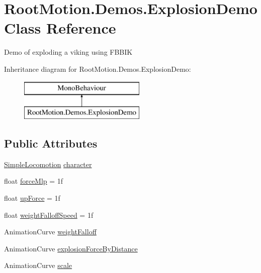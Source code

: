\hypertarget{class_root_motion_1_1_demos_1_1_explosion_demo}{}\section{Root\+Motion.\+Demos.\+Explosion\+Demo Class Reference}
\label{class_root_motion_1_1_demos_1_1_explosion_demo}


Demo of exploding a viking using F\+B\+B\+IK  


Inheritance diagram for Root\+Motion.\+Demos.\+Explosion\+Demo\+:\begin{figure}[H]
\begin{center}
\leavevmode
\includegraphics[height=2.000000cm]{class_root_motion_1_1_demos_1_1_explosion_demo}
\end{center}
\end{figure}
\subsection*{Public Attributes}
\begin{DoxyCompactItemize}
\item 
\mbox{\hyperlink{class_root_motion_1_1_demos_1_1_simple_locomotion}{Simple\+Locomotion}} \mbox{\hyperlink{class_root_motion_1_1_demos_1_1_explosion_demo_a1657eeab96d984275fc68ca602036c65}{character}}
\item 
float \mbox{\hyperlink{class_root_motion_1_1_demos_1_1_explosion_demo_a020b0d0b64adfe3c28269cf059c82fc6}{force\+Mlp}} = 1f
\item 
float \mbox{\hyperlink{class_root_motion_1_1_demos_1_1_explosion_demo_a564ad67db7e23d28e0bf882af53f1083}{up\+Force}} = 1f
\item 
float \mbox{\hyperlink{class_root_motion_1_1_demos_1_1_explosion_demo_a5caba78bb333e642f9607fb82d10b1af}{weight\+Falloff\+Speed}} = 1f
\item 
Animation\+Curve \mbox{\hyperlink{class_root_motion_1_1_demos_1_1_explosion_demo_a2a44c8e9f67d3d2d2c7f681118078ea6}{weight\+Falloff}}
\item 
Animation\+Curve \mbox{\hyperlink{class_root_motion_1_1_demos_1_1_explosion_demo_ad3bca15a429aa13496736020ab62a3aa}{explosion\+Force\+By\+Distance}}
\item 
Animation\+Curve \mbox{\hyperlink{class_root_motion_1_1_demos_1_1_explosion_demo_a9c4c4c92b674b9c2c2c8754adc3c6416}{scale}}
\end{DoxyCompactItemize}


